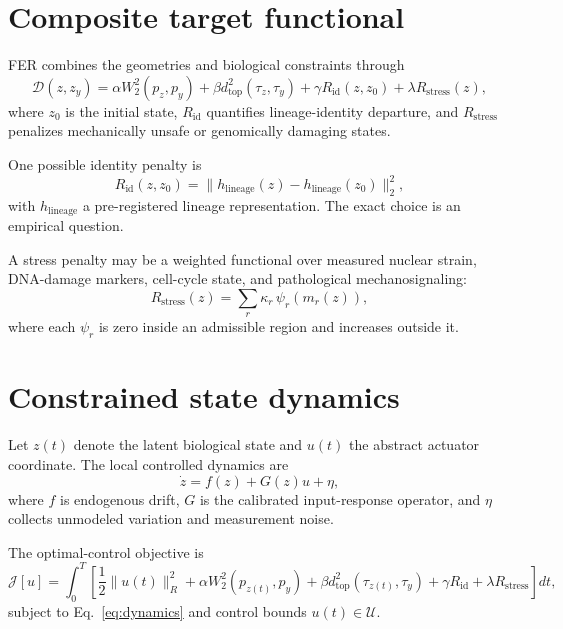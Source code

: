 \documentclass[11pt]{article}
\begin{document}
\section{Composite target functional}
FER combines the geometries and biological constraints through
\begin{equation}
 \mathcal D(z,z_y)=\alpha W_2^2(p_z,p_y)+\beta d_{\mathrm{top}}^2(\tau_z,\tau_y)+\gamma R_{\mathrm{id}}(z,z_0)+\lambda R_{\mathrm{stress}}(z),
\label{eq:composite}
\end{equation}
where $z_0$ is the initial state, $R_{\mathrm{id}}$ quantifies lineage-identity departure, and $R_{\mathrm{stress}}$ penalizes mechanically unsafe or genomically damaging states.

One possible identity penalty is
\begin{equation}
 R_{\mathrm{id}}(z,z_0)=\|h_{\mathrm{lineage}}(z)-h_{\mathrm{lineage}}(z_0)\|_2^2,
\label{eq:idpenalty}
\end{equation}
with $h_{\mathrm{lineage}}$ a pre-registered lineage representation. The exact choice is an empirical question.

A stress penalty may be a weighted functional over measured nuclear strain, DNA-damage markers, cell-cycle state, and pathological mechanosignaling:
\begin{equation}
 R_{\mathrm{stress}}(z)=\sum_r \kappa_r\,\psi_r(m_r(z)),
\label{eq:stresspenalty}
\end{equation}
where each $\psi_r$ is zero inside an admissible region and increases outside it.

\section{Constrained state dynamics}
Let $z(t)$ denote the latent biological state and $u(t)$ the abstract actuator coordinate. The local controlled dynamics are
\begin{equation}
 \dot z=f(z)+G(z)u+\eta,
\label{eq:dynamics}
\end{equation}
where $f$ is endogenous drift, $G$ is the calibrated input-response operator, and $\eta$ collects unmodeled variation and measurement noise.

The optimal-control objective is
\begin{equation}
 \mathcal J[u]=\int_0^T\left[\frac{1}{2}\|u(t)\|_{R}^2+\alpha W_2^2(p_{z(t)},p_y)+\beta d_{\mathrm{top}}^2(\tau_{z(t)},\tau_y)+\gamma R_{\mathrm{id}}+\lambda R_{\mathrm{stress}}\right]dt,
\label{eq:controlobjective}
\end{equation}
subject to Eq.~\eqref{eq:dynamics} and control bounds $u(t)\in\mathcal U$.
\end{document}

